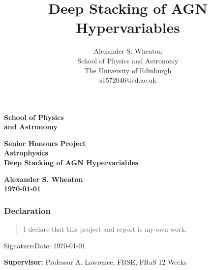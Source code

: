 \documentclass[a4paper,11pt]{article}
\title{Deep Stacking of AGN Hypervariables}
\author{
    Alexander S. Wheaton\\
    School of Physics and Astronomy\\
    The University of Edinburgh\\
    s1572046@ed.ac.uk\break
}
\begin{document}
\pagestyle{empty}                       %
\epsfxsize=40mm                         %
\begin{minipage}[b]{110mm}
    {\Huge\bf School of Physics\\ and Astronomy
    \vspace*{17mm}}
\end{minipage}
\hfill
\begin{minipage}[t]{40mm}
\end{minipage}
\par\noindent                                           %
\vspace*{2cm}
\begin{center}
    \Large\bf \Large\bf Senior Honours Project\\
    \Large\bf Astrophysics\\[10pt]                     %
    \LARGE\bf Deep Stacking of AGN Hypervariables
\end{center}
\vspace*{0.5cm}
\begin{center}
    \bf Alexander S. Wheaton\\
    \today
\end{center}
\vspace*{5mm}

\begin{abstract}
        \lipsum[1]
\end{abstract}

\vspace*{1cm}

\subsubsection*{Declaration}
\begin{quotation}
        I declare that this project and report is my own work.
\end{quotation}

Signature:\hspace*{8cm}Date: \today

\vfill
{\bf Supervisor:} Professor A. Lawrence, FRSE, FRaS
\hfill
12 Weeks
\end{document}
